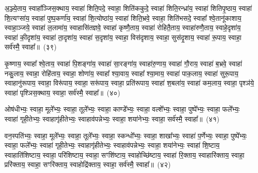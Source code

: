 {\anuvakamend[{पा॒र्श्वाभ्या॒ꣴ॒ स्वाहा॑ म॒ज्जभ्यः॒ स्वाहा॒ षट्च॑}]}%

अ॒ञ्ज्ये॒ताय॒ स्वाहा᳚ञ्जिस॒क्थाय॒ स्वाहा॑ शिति॒पदे॒ स्वाहा॒ शिति॑ककुदे॒ स्वाहा॑ शिति॒रन्ध्रा॑य॒ स्वाहा॑ शितिपृ॒ष्ठाय॒ स्वाहा॑ शि॒त्यꣳसा॑य॒ स्वाहा॑ पुष्प॒कर्णा॑य॒ स्वाहा॑ शि॒त्योष्ठा॑य॒ स्वाहा॑ शिति॒भ्रवे॒ स्वाहा॒ शिति॑भसदे॒ स्वाहा᳚ श्वे॒तानू॑काशाय॒ स्वाहा॒ञ्जये॒ स्वाहा॑ ल॒लामा॑य॒ स्वाहासि॑तज्ञवे॒ स्वाहा॑ कृष्णै॒ताय॒ स्वाहा॑ रोहितै॒ताय॒ स्वाहा॑रुणै॒ताय॒ स्वाहे॒दृशा॑य॒ स्वाहा॑ की॒दृशा॑य॒ स्वाहा॑ ता॒दृशा॑य॒ स्वाहा॑ स॒दृशा॑य॒ स्वाहा॒ विस॑दृशाय॒ स्वाहा॒ सुस॑दृ॒शाय॒ स्वाहा॑ रू॒पाय॒ स्वाहा॒ सर्व॑स्मै॒ स्वाहा᳚॥~(३९)

{\anuvakamend[{रू॒पाय॒ स्वाहा॒ द्वे च॑}]}%

कृ॒ष्णाय॒ स्वाहा᳚ श्वे॒ताय॒ स्वाहा॑ पि॒शङ्गा॑य॒ स्वाहा॑ सा॒रङ्गा॑य॒ स्वाहा॑रु॒णाय॒ स्वाहा॑ गौ॒राय॒ स्वाहा॑ ब॒भ्रवे॒ स्वाहा॑ नकु॒लाय॒ स्वाहा॒ रोहि॑ताय॒ स्वाहा॒ शोणा॑य॒ स्वाहा᳚ श्या॒वाय॒ स्वाहा᳚ श्या॒माय॒ स्वाहा॑ पाक॒लाय॒ स्वाहा॑ सुरू॒पाय॒ स्वाहानु॑रूपाय॒ स्वाहा॒ विरू॑पाय॒ स्वाहा॒ सरू॑पाय॒ स्वाहा॒ प्रति॑रूपाय॒ स्वाहा॑ श॒बला॑य॒ स्वाहा॑ कम॒लाय॒ स्वाहा॒ पृश्ञ॑ये॒ स्वाहा॑ पृश्ञिस॒क्थाय॒ स्वाहा॒ सर्व॑स्मै॒ स्वाहा᳚॥~(४०)

{\anuvakamend[{कृ॒ष्णाय॒ षट्च॑त्वारिꣳशत्}]}%

ओष॑धीभ्यः॒ स्वाहा॒ मूले᳚भ्यः॒ स्वाहा॒ तूले᳚भ्यः॒ स्वाहा॒ काण्डे᳚भ्यः॒ स्वाहा॒ वल्\mbox{}शे᳚भ्यः॒ स्वाहा॒ पुष्पे᳚भ्यः॒ स्वाहा॒ फले᳚भ्यः॒ स्वाहा॑ गृही॒तेभ्यः॒ स्वाहागृ॑हीतेभ्यः॒ स्वाहाव॑पन्नेभ्यः॒ स्वाहा॒ शया॑नेभ्यः॒ स्वाहा॒ सर्व॑स्मै॒ स्वाहा᳚॥~(४१)

{\anuvakamend[{ओष॑धीभ्य॒श्चतु॑र्विꣳशतिः}]}%

वन॒स्पति॑भ्यः॒ स्वाहा॒ मूले᳚भ्यः॒ स्वाहा॒ तूले᳚भ्यः॒ स्वाहा॒ स्कन्धो᳚भ्यः॒ स्वाहा॒ शाखा᳚भ्यः॒ स्वाहा॑ प॒र्णेभ्यः॒ स्वाहा॒ पुष्पे᳚भ्यः॒ स्वाहा॒ फले᳚भ्यः॒ स्वाहा॑ गृही॒तेभ्यः॒ स्वाहागृ॑हीतेभ्यः॒ स्वाहाव॑पन्नेभ्यः॒ स्वाहा॒ शया॑नेभ्यः॒ स्वाहा॑ शि॒ष्टाय॒ स्वाहाति॑शिष्टाय॒ स्वाहा॒ परि॑शिष्टाय॒ स्वाहा॒ सꣳशि॑ष्टाय॒ स्वाहोच्छि॑ष्टाय॒ स्वाहा॑ रि॒क्ताय॒ स्वाहारि॑क्ताय॒ स्वाहा॒ प्ररि॑क्ताय॒ स्वाहा॒ सꣳरि॑क्ताय॒ स्वाहोद्रि॑क्ताय॒ स्वाहा॒ सर्व॑स्मै॒ स्वाहा᳚॥~(४२)

{\anuvakamend[{वन॒स्पति॑भ्यः॒ स्कन्धो᳚भ्यः शि॒ष्टाय॑ रि॒क्ताय॒ षट्च॑त्वारिꣳशत्}]}%

{}

